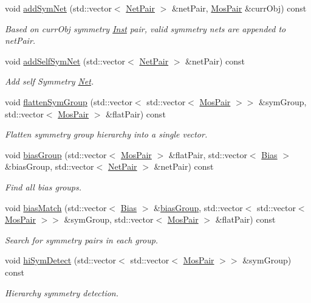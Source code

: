 \begin{DoxyCompactItemize}
void \hyperlink{classSymDetect_a3d47390c92f0bd31d1ab84f1a62d66e3}{add\+Sym\+Net} (std\+::vector$<$ \hyperlink{classNetPair}{Net\+Pair} $>$ \&net\+Pair, \hyperlink{classMosPair}{Mos\+Pair} \&curr\+Obj) const
\begin{DoxyCompactList}\small\item\em Based on curr\+Obj symmetry \hyperlink{classInst}{Inst} pair, valid symmetry nets are appended to net\+Pair. \end{DoxyCompactList}\item 
void \hyperlink{classSymDetect_aecaa47ed0a3318167148a46d6458f83a}{add\+Self\+Sym\+Net} (std\+::vector$<$ \hyperlink{classNetPair}{Net\+Pair} $>$ \&net\+Pair) const
\begin{DoxyCompactList}\small\item\em Add self Symmetry \hyperlink{classNet}{Net}. \end{DoxyCompactList}\item 
void \hyperlink{classSymDetect_a4c50f078fd01ab52e8f50b0507b69556}{flatten\+Sym\+Group} (std\+::vector$<$ std\+::vector$<$ \hyperlink{classMosPair}{Mos\+Pair} $>$$>$ \&sym\+Group, std\+::vector$<$ \hyperlink{classMosPair}{Mos\+Pair} $>$ \&flat\+Pair) const
\begin{DoxyCompactList}\small\item\em Flatten symmetry group hierarchy into a single vector. \end{DoxyCompactList}\item 
void \hyperlink{classSymDetect_a1f9fc68f67c56771e6b9b613b53c821f}{bias\+Group} (std\+::vector$<$ \hyperlink{classMosPair}{Mos\+Pair} $>$ \&flat\+Pair, std\+::vector$<$ \hyperlink{classBias}{Bias} $>$ \&bias\+Group, std\+::vector$<$ \hyperlink{classNetPair}{Net\+Pair} $>$ \&net\+Pair) const
\begin{DoxyCompactList}\small\item\em Find all bias groups. \end{DoxyCompactList}\item 
void \hyperlink{classSymDetect_a4c7109dd0519c1c11765fe00f4a21fe2}{bias\+Match} (std\+::vector$<$ \hyperlink{classBias}{Bias} $>$ \&\hyperlink{classSymDetect_a1f9fc68f67c56771e6b9b613b53c821f}{bias\+Group}, std\+::vector$<$ std\+::vector$<$ \hyperlink{classMosPair}{Mos\+Pair} $>$$>$ \&sym\+Group, std\+::vector$<$ \hyperlink{classMosPair}{Mos\+Pair} $>$ \&flat\+Pair) const
\begin{DoxyCompactList}\small\item\em Search for symmetry pairs in each group. \end{DoxyCompactList}\item 
void \hyperlink{classSymDetect_a81ec317ab0f508b3e0af483ef8a2c1ac}{hi\+Sym\+Detect} (std\+::vector$<$ std\+::vector$<$ \hyperlink{classMosPair}{Mos\+Pair} $>$$>$ \&sym\+Group) const
\begin{DoxyCompactList}\small\item\em Hierarchy symmetry detection. \end{DoxyCompactList}\end{DoxyCompactItemize}
